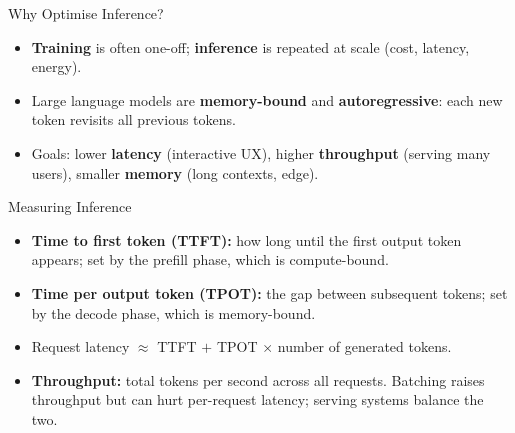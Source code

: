 \begin{frame}{Why Optimise Inference?}
  \begin{itemize}
    \item[\textcolor{red}{$\blacktriangleright$}] \textbf{Training} is often one-off; \textbf{inference} is repeated at scale (cost, latency, energy).
    \item[\textcolor{red}{$\blacktriangleright$}] Large language models are \textbf{memory-bound} and \textbf{autoregressive}: each new token revisits all previous tokens.
    \item[\textcolor{red}{$\blacktriangleright$}] Goals: lower \textbf{latency} (interactive UX), higher \textbf{throughput} (serving many users), smaller \textbf{memory} (long contexts, edge).
  \end{itemize}
\end{frame}

\begin{frame}{Measuring Inference}
  \begin{itemize}\itemsep0.5em
    \item[\textcolor{red}{$\blacktriangleright$}] \textbf{Time to first token (TTFT):} how long until the first output token appears; set by the prefill phase, which is compute-bound.
    \item[\textcolor{red}{$\blacktriangleright$}] \textbf{Time per output token (TPOT):} the gap between subsequent tokens; set by the decode phase, which is memory-bound.
    \item[\textcolor{red}{$\blacktriangleright$}] Request latency $\approx$ TTFT $+$ TPOT $\times$ number of generated tokens.
    \item[\textcolor{red}{$\blacktriangleright$}] \textbf{Throughput:} total tokens per second across all requests. Batching raises throughput but can hurt per-request latency; serving systems balance the two.
  \end{itemize}
\end{frame}
